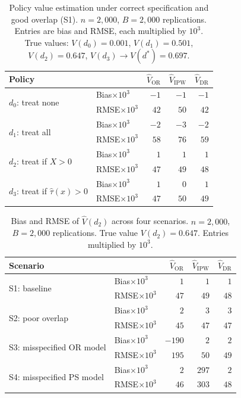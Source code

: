 \documentclass[master.tex]{subfiles}
\begin{document}
\begin{table}[ht]
\centering
\caption{Policy value estimation under correct specification and good
overlap (S1). $n=2{,}000$, $B=2{,}000$ replications.
Entries are bias and RMSE, each multiplied by $10^3$.
True values: $V(d_0)=0.001$, $V(d_1)=0.501$, $V(d_2)=0.647$,
$V(d_3)\to V(d^*)=0.697$.}
\label{w13:tab:sim-s1}
\renewcommand{\arraystretch}{1.3}
\begin{tabular}{llrrr}
\hline
Policy & & $\hat V_{\mathrm{OR}}$ & $\hat V_{\mathrm{IPW}}$ &
           $\hat V_{\mathrm{DR}}$ \\
\hline
\multirow{2}{*}{$d_0$: treat none}
  & Bias$\times 10^3$ & $-1$ & $-1$ & $-1$ \\
  & RMSE$\times 10^3$ & $42$ & $50$ & $42$ \\[4pt]
\multirow{2}{*}{$d_1$: treat all}
  & Bias$\times 10^3$ & $-2$ & $-3$ & $-2$ \\
  & RMSE$\times 10^3$ & $58$ & $76$ & $59$ \\[4pt]
\multirow{2}{*}{$d_2$: treat if $X>0$}
  & Bias$\times 10^3$ & $1$ & $1$ & $1$ \\
  & RMSE$\times 10^3$ & $47$ & $49$ & $48$ \\[4pt]
\multirow{2}{*}{$d_3$: treat if $\hat\tau(x)>0$}
  & Bias$\times 10^3$ & $1$ & $0$ & $1$ \\
  & RMSE$\times 10^3$ & $47$ & $50$ & $49$ \\
\hline
\end{tabular}
\end{table}

\begin{table}[ht]
\centering
\caption{Bias and RMSE of $\hat V(d_2)$ across four scenarios.
$n=2{,}000$, $B=2{,}000$ replications.  True value $V(d_2)=0.647$.
Entries multiplied by $10^3$.}
\label{w13:tab:sim-scenarios}
\renewcommand{\arraystretch}{1.3}
\begin{tabular}{llrrr}
\hline
Scenario & & $\hat V_{\mathrm{OR}}$ & $\hat V_{\mathrm{IPW}}$ &
             $\hat V_{\mathrm{DR}}$ \\
\hline
\multirow{2}{*}{S1: baseline}
  & Bias$\times 10^3$ & $1$    & $1$   & $1$  \\
  & RMSE$\times 10^3$ & $47$   & $49$  & $48$ \\[4pt]
\multirow{2}{*}{S2: poor overlap}
  & Bias$\times 10^3$ & $2$    & $3$   & $3$  \\
  & RMSE$\times 10^3$ & $45$   & $47$  & $47$ \\[4pt]
\multirow{2}{*}{S3: misspecified OR model}
  & Bias$\times 10^3$ & $-190$ & $2$   & $2$  \\
  & RMSE$\times 10^3$ & $195$  & $50$  & $49$ \\[4pt]
\multirow{2}{*}{S4: misspecified PS model}
  & Bias$\times 10^3$ & $2$    & $297$ & $2$  \\
  & RMSE$\times 10^3$ & $46$   & $303$ & $48$ \\
\hline
\end{tabular}
\end{table}
\end{document}
